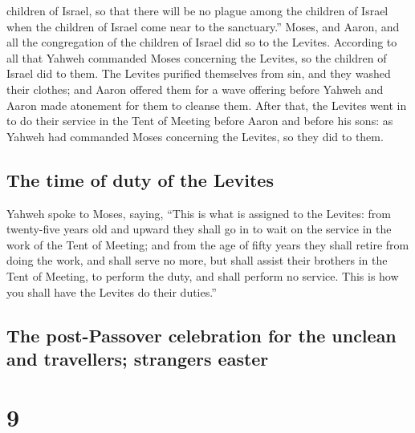 children of Israel, so that there will be no plague among the children
of Israel when the children of Israel come near to the sanctuary.''
 Moses, and Aaron, and all the congregation of the
children of Israel did so to the Levites. According to all that Yahweh
commanded Moses concerning the Levites, so the children of Israel did to
them.  The Levites purified themselves from sin, and they
washed their clothes; and Aaron offered them for a wave offering before
Yahweh and Aaron made atonement for them to cleanse them.
 After that, the Levites went in to do their service in
the Tent of Meeting before Aaron and before his sons: as Yahweh had
commanded Moses concerning the Levites, so they did to them.

\hypertarget{the-time-of-duty-of-the-levites}{%
\subsection{The time of duty of the
Levites}\label{the-time-of-duty-of-the-levites}}

 Yahweh spoke to Moses, saying,  ``This is
what is assigned to the Levites: from twenty-five years old and upward
they shall go in to wait on the service in the work of the Tent of
Meeting;  and from the age of fifty years they shall
retire from doing the work, and shall serve no more,  but
shall assist their brothers in the Tent of Meeting, to perform the duty,
and shall perform no service. This is how you shall have the Levites do
their duties.''

\hypertarget{the-post-passover-celebration-for-the-unclean-and-travellers-strangers-easter}{%
\subsection{The post-Passover celebration for the unclean and
travellers; strangers
easter}\label{the-post-passover-celebration-for-the-unclean-and-travellers-strangers-easter}}

\hypertarget{section-8}{%
\section{9}\label{section-8}}

